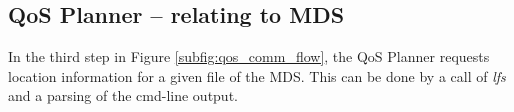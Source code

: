 \documentclass[10pt]{article}
\begin{document}





\subsection{QoS Planner -- relating to MDS}
In the third step in Figure \ref{subfig:qos_comm_flow}, the QoS Planner requests location information for a given file of the MDS.
This can be done by a call of \emph{lfs} and a parsing of the cmd-line output. 
\end{document}
